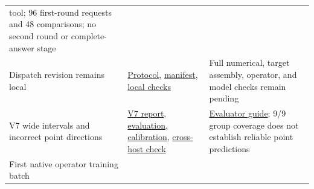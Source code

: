 \documentclass[10pt,a4paper]{article}
\begin{document}
\begin{longtable}[]{@{}lll@{}}
\begin{minipage}[t]{0.30\columnwidth}
{tool}; 96 first-round requests and 48 comparisons; no second round or
complete-answer stage\strut
\end{minipage}\tabularnewline
\begin{minipage}[t]{0.30\columnwidth}\raggedright
Dispatch revision remains local\strut
\end{minipage} & \begin{minipage}[t]{0.30\columnwidth}\raggedright
\href{https://github.com/MoyaMryia/riscv-accl/blob/main/spacemit/experiments/2026-10-12-combined-dispatch-r2-local-protocol.md}{Protocol},
\href{https://github.com/MoyaMryia/riscv-accl/blob/main/spacemit/reports/raw/k1-combined-stop-audit-20261012/dispatch-manifest.json}{manifest},
\href{https://github.com/MoyaMryia/riscv-accl/blob/main/spacemit/reports/raw/k1-combined-stop-audit-20261012/tests.log}{local
checks}\strut
\end{minipage} & \begin{minipage}[t]{0.30\columnwidth}\raggedright
Full numerical, target assembly, operator, and model checks remain
pending\strut
\end{minipage}\tabularnewline
\begin{minipage}[t]{0.30\columnwidth}\raggedright
V7 wide intervals and incorrect point directions\strut
\end{minipage} & \begin{minipage}[t]{0.30\columnwidth}\raggedright
\href{https://github.com/MoyaMryia/riscv-accl/blob/main/spacemit/reports/2026-10-12-k1-model-v7.md}{V7
report},
\href{https://github.com/MoyaMryia/riscv-accl/blob/main/spacemit/reports/raw/k1-model-v7-20261012/evaluation.json}{evaluation},
\href{https://github.com/MoyaMryia/riscv-accl/blob/main/spacemit/reports/raw/k1-model-v7-20261012/calibration.json}{calibration},
\href{https://github.com/MoyaMryia/riscv-accl/blob/main/spacemit/reports/raw/k1-model-v7-20261012/cross-host-check.json}{cross-host
check}\strut
\end{minipage} & \begin{minipage}[t]{0.30\columnwidth}\raggedright
\href{https://github.com/MoyaMryia/riscv-accl/blob/main/spacemit/bench/qemu-screen/predictor/README.md}{Evaluator
guide}; 9/9 group coverage does not establish reliable point
predictions\strut
\end{minipage}\tabularnewline
\begin{minipage}[t]{0.30\columnwidth}\raggedright
First native operator training batch\strut
\end{minipage} & \begin{minipage}[t]{0.30\columnwidth}\raggedright

\end{minipage}
\end{longtable}
\end{document}
